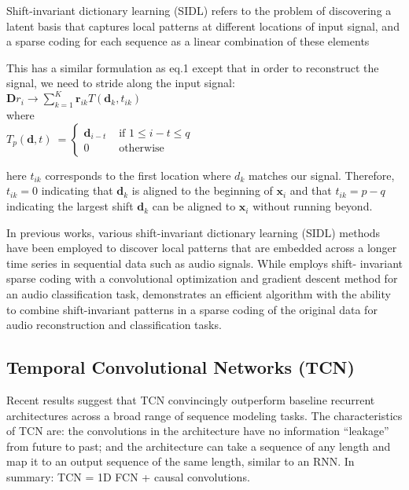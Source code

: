 \documentclass[11pt,a4paper]{article}
\begin{document}
Shift-invariant dictionary learning (SIDL) refers to the problem of discovering a latent basis that captures local patterns at different locations of input signal, and a sparse coding for each sequence as a linear combination of these elements \cite{Zheng2016} 

This has a similar formulation as eq.1 except that in order to reconstruct the signal, we need to stride along the input signal:  \\
$\mathbf{D} r_{i} \longrightarrow \sum_{k=1}^{K} \boldsymbol{r}_{i k} T\left(\mathbf{d}_{k}, t_{i k}\right)$
\\
where \\
$T_{p}(\mathbf{d}, t) \ =\begin{cases}\mathbf{d}_{i-t} & \text { if } 1 \leq i-t \leq q \\ 0 & \text { otherwise }\end{cases}$

here $t_{i k}$ corresponds to the first location where $d_k$ matches our signal. Therefore, $t_{i k}=0$ indicating that $\mathbf{d}_{k}$ is aligned to the beginning of $\mathbf{x}_{i}$ and that $t_{i k}=p-q$ indicating the largest shift $\mathbf{d}_{k}$ can be aligned to $\mathbf{x}_{i}$ without running beyond.


In previous works, various shift-invariant dictionary learning (SIDL) methods have been employed to discover local patterns that are embedded across a longer time series in sequential data such as audio signals. While \cite{Grosse2007} employs shift-
invariant sparse coding with a convolutional optimization and gradient descent method for an audio classification task, \cite{Zheng2016} demonstrates an efficient algorithm with the ability to combine shift-invariant patterns in a sparse coding of the original data for audio reconstruction and classification tasks. 



\subsection{Temporal Convolutional Networks (TCN) }

Recent results suggest that TCN convincingly outperform
baseline recurrent architectures across a broad range of sequence modeling tasks. The characteristics of TCN are: the convolutions in the architecture have no information “leakage” from future to past; and the architecture can take a sequence of any length and map it to
an output sequence of the same length, similar to an RNN. In summary: TCN = 1D FCN + causal convolutions.
\end{document}
